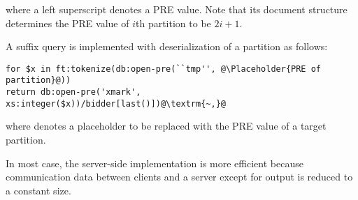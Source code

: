 where a left superscript denotes a PRE value. Note that its document structure
determines the PRE value of $i$th partition to be $2i+1$.

A suffix query is implemented with deserialization of a partition as follows:

\begin{lstlisting}[escapechar=\@]
for $x in ft:tokenize(db:open-pre(``tmp'', @\Placeholder{PRE of partition}@))
return db:open-pre('xmark', xs:integer($x))/bidder[last()])@\textrm{~,}@
\end{lstlisting}

where  denotes a placeholder to be replaced with
the PRE value of a target partition.

In most case, the server-side implementation is more efficient because
communication data between clients and a server except for output is reduced to
a constant size.

